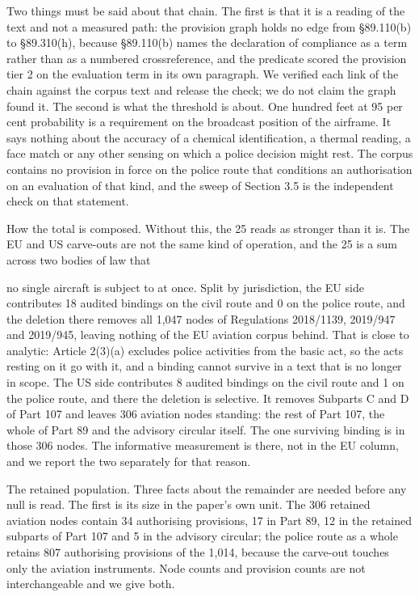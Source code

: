 Two things must be said about that chain. The first is that it is a reading of the text and not a measured path: the provision graph holds no edge from \S{}89.110(b) to \S{}89.310(h), because \S{}89.110(b) names the declaration of compliance as a term rather than as a numbered crossreference, and the predicate scored the provision tier 2 on the evaluation term in its own paragraph. We verified each link of the chain against the corpus text and release the check; we do not claim the graph found it. The second is what the threshold is about. One hundred feet at 95 per cent probability is a requirement on the broadcast position of the airframe. It says nothing about the accuracy of a chemical identification, a thermal reading, a face match or any other sensing on which a police decision might rest. The corpus contains no provision in force on the police route that conditions an authorisation on an evaluation of that kind, and the sweep of Section 3.5 is the independent check on that statement.

How the total is composed. Without this, the 25 reads as stronger than it is. The EU and US carve-outs are not the same kind of operation, and the 25 is a sum across two bodies of law that

no single aircraft is subject to at once. Split by jurisdiction, the EU side contributes 18 audited bindings on the civil route and 0 on the police route, and the deletion there removes all 1,047 nodes of Regulations 2018/1139, 2019/947 and 2019/945, leaving nothing of the EU aviation corpus behind. That is close to analytic: Article 2(3)(a) excludes police activities from the basic act, so the acts resting on it go with it, and a binding cannot survive in a text that is no longer in scope. The US side contributes 8 audited bindings on the civil route and 1 on the police route, and there the deletion is selective. It removes Subparts C and D of Part 107 and leaves 306 aviation nodes standing: the rest of Part 107, the whole of Part 89 and the advisory circular itself. The one surviving binding is in those 306 nodes. The informative measurement is there, not in the EU column, and we report the two separately for that reason.

The retained population. Three facts about the remainder are needed before any null is read. The first is its size in the paper's own unit. The 306 retained aviation nodes contain 34 authorising provisions, 17 in Part 89, 12 in the retained subparts of Part 107 and 5 in the advisory circular; the police route as a whole retains 807 authorising provisions of the 1,014, because the carve-out touches only the aviation instruments. Node counts and provision counts are not interchangeable and we give both.

